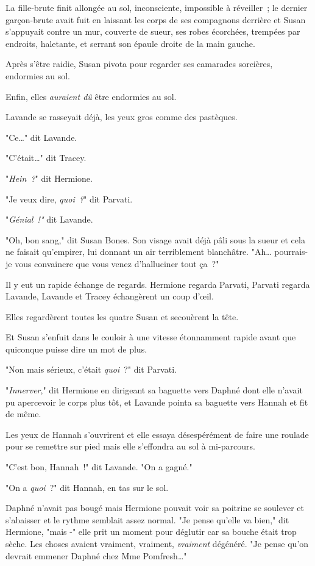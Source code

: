 La fille-brute finit allongée au sol, inconsciente, impossible à réveiller~; le dernier garçon-brute avait fuit en laissant les corps de ses compagnons derrière et Susan s'appuyait contre un mur, couverte de sueur, ses robes écorchées, trempées par endroits, haletante, et serrant son épaule droite de la main gauche.

Après s'être raidie, Susan pivota pour regarder ses camarades sorcières, endormies au sol.

Enfin, elles \emph{auraient dû} être endormies au sol.

Lavande se rasseyait déjà, les yeux gros comme des pastèques.

"Ce…" dit Lavande.

"C'était…" dit Tracey.

"\emph{Hein~?}" dit Hermione.

"Je veux dire, \emph{quoi~?}" dit Parvati.

"\emph{Génial~!"} dit Lavande.

"Oh, bon sang," dit Susan Bones. Son visage avait déjà pâli sous la sueur et cela ne faisait qu'empirer, lui donnant un air terriblement blanchâtre. "Ah… pourrais-je vous convaincre que vous venez d'halluciner tout ça~?"

Il y eut un rapide échange de regards. Hermione regarda Parvati, Parvati regarda Lavande, Lavande et Tracey échangèrent un coup d'œil.

Elles regardèrent toutes les quatre Susan et secouèrent la tête.

Et Susan s'enfuit dans le couloir à une vitesse étonnamment rapide avant que quiconque puisse dire un mot de plus.

"Non mais sérieux, c'était \emph{quoi}~?" dit Parvati.

"\emph{Innerver}," dit Hermione en dirigeant sa baguette vers Daphné dont elle n'avait pu apercevoir le corps plus tôt, et Lavande pointa sa baguette vers Hannah et fit de même.

Les yeux de Hannah s'ouvrirent et elle essaya désespérément de faire une roulade pour se remettre sur pied mais elle s'effondra au sol à mi-parcours.

"C'est bon, Hannah~!" dit Lavande. "On a gagné."

"On a \emph{quoi}~?" dit Hannah, en tas sur le sol.

Daphné n'avait pas bougé mais Hermione pouvait voir sa poitrine se soulever et s'abaisser et le rythme semblait assez normal. "Je pense qu'elle va bien," dit Hermione, "mais -" elle prit un moment pour déglutir car sa bouche était trop sèche. Les choses avaient vraiment, vraiment, \emph{vraiment} dégénéré. "Je pense qu'on devrait emmener Daphné chez Mme Pomfresh…"

